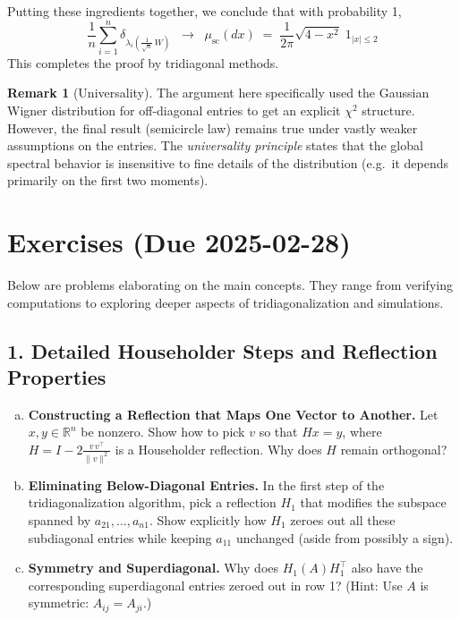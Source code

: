 \documentclass[letterpaper,11pt,oneside,reqno]{article}
\numberwithin{equation}{section}
\theoremstyle{definition}
\newtheorem{remark}[proposition]{Remark}
\begin{document}
Putting these ingredients together, we conclude that with probability 1,
\[
  \frac{1}{n}\sum_{i=1}^n \delta_{\lambda_i(\frac1{\sqrt{n}}\,W)}
  \;\;\longrightarrow\;\;
  \mu_{\mathrm{sc}}(dx) \;=\; \frac{1}{2\pi}\sqrt{4-x^2}\; 1_{|x|\le2}
\]
This completes the proof by tridiagonal methods.

\begin{remark}[Universality]
The argument here specifically used the Gaussian Wigner distribution for off-diagonal entries to get an explicit $\chi^2$ structure. However, the final result (semicircle law) remains true under vastly weaker assumptions on the entries. The \emph{universality principle} states that the global spectral behavior is insensitive to fine details of the distribution (e.g.\ it depends primarily on the first two moments).
\end{remark}







\section{Exercises (Due 2025-02-28)}
\label{sec:exercises}

Below are problems elaborating on the main concepts. They range from verifying computations to exploring deeper aspects of tridiagonalization and simulations.

\subsection*{1. Detailed Householder Steps and Reflection Properties}

\begin{enumerate}[(a)]
\item {\bf Constructing a Reflection that Maps One Vector to Another.}
  Let $x,y\in \mathbb{R}^n$ be nonzero. Show how to pick $v$ so that $Hx=y$, where $H=I-2\frac{v\,v^\top}{\|v\|^2}$ is a Householder reflection. Why does $H$ remain orthogonal?
\item {\bf Eliminating Below-Diagonal Entries.}
  In the first step of the tridiagonalization algorithm, pick a reflection $H_1$ that modifies the subspace spanned by $a_{21},\dots,a_{n1}$. Show explicitly how $H_1$ zeroes out all these subdiagonal entries while keeping $a_{11}$ unchanged (aside from possibly a sign).
\item {\bf Symmetry and Superdiagonal.}
  Why does $H_1 (A) H_1^\top$ also have the corresponding superdiagonal entries zeroed out in row 1? (Hint: Use $A$ is symmetric: $A_{ij}=A_{ji}$.)
\end{enumerate}
\end{document}
